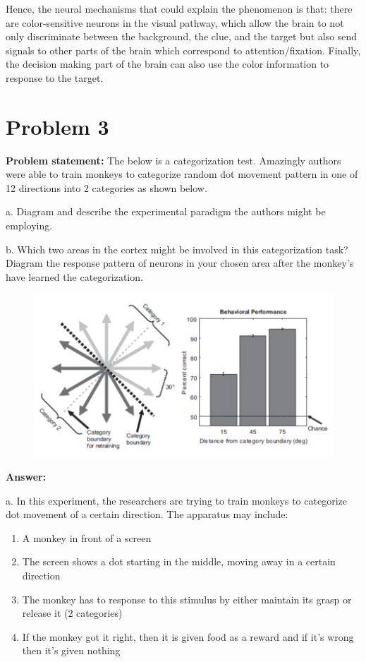 \documentclass[letterpaper, 11pt]{article}
\begin{document}
Hence, the neural mechanisms that could explain the phenomenon is that: there are color-sensitive neurons in the visual pathway, which allow the brain to not only discriminate between the background, the clue, and the target but also send signals to other parts of the brain which correspond to attention/fixation. Finally, the decision making part of the brain can also use the color information to response to the target.


\section{Problem 3}
\label{sec:prob3}
\textbf{Problem statement:} The below is a categorization test. Amazingly authors were able to train monkeys to categorize random dot movement pattern in one of 12 directions into 2 categories as shown below.

a. Diagram and describe the experimental paradigm the authors might be employing.

b. Which two areas in the cortex might be involved in this categorization task? Diagram the response pattern of neurons in your chosen area after the monkey’s have learned the categorization.

\begin{figure}[htb!]
	\centering
	\includegraphics[width=0.8\linewidth]{fig3.png}
	\label{fig3}
\end{figure}

\textbf{Answer:}

a. In this experiment, the researchers are trying to train monkeys to categorize dot movement of a certain direction. The apparatus may include:

\begin{enumerate}
	\item A monkey in front of a screen
	\item The screen shows a dot starting in the middle, moving away in a certain direction
	\item The monkey has to response to this stimulus by either maintain its grasp or release it (2 categories)
	\item If the monkey got it right, then it is given food as a reward and if it's wrong then it's given nothing
\end{enumerate}
\end{document}
